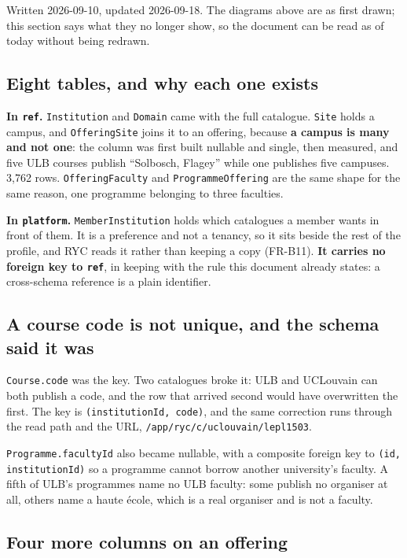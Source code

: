 \documentclass[11pt,a4paper]{article}
\begin{document}
Written 2026-09-10, updated 2026-09-18. The diagrams above are as first drawn;
this section says what they no longer show, so the document can be read as of
today without being redrawn.

\subsection{Eight tables, and why each one exists}

\textbf{In \texttt{ref}.} \texttt{Institution} and \texttt{Domain} came with
the full catalogue. \texttt{Site} holds a campus, and \texttt{OfferingSite}
joins it to an offering, because \textbf{a campus is many and not one}: the
column was first built nullable and single, then measured, and five ULB courses
publish ``Solbosch, Flagey'' while one publishes five campuses. 3{,}762 rows.
\texttt{OfferingFaculty} and \texttt{ProgrammeOffering} are the same shape for
the same reason, one programme belonging to three faculties.

\textbf{In \texttt{platform}.} \texttt{MemberInstitution} holds which
catalogues a member wants in front of them. It is a preference and not a
tenancy, so it sits beside the rest of the profile, and RYC reads it rather
than keeping a copy (FR-B11). \textbf{It carries no foreign key to
\texttt{ref}}, in keeping with the rule this document already states: a
cross-schema reference is a plain identifier.

\subsection{A course code is not unique, and the schema said it was}

\texttt{Course.code} was the key. Two catalogues broke it: ULB and UCLouvain
can both publish a code, and the row that arrived second would have overwritten
the first. The key is \texttt{(institutionId, code)}, and the same correction
runs through the read path and the URL, \texttt{/app/ryc/c/uclouvain/lepl1503}.

\texttt{Programme.facultyId} also became nullable, with a composite foreign key
to \texttt{(id, institutionId)} so a programme cannot borrow another
university's faculty. A fifth of ULB's programmes name no ULB faculty: some
publish no organiser at all, others name a haute école, which is a real
organiser and is not a faculty.

\subsection{Four more columns on an offering}
\end{document}
